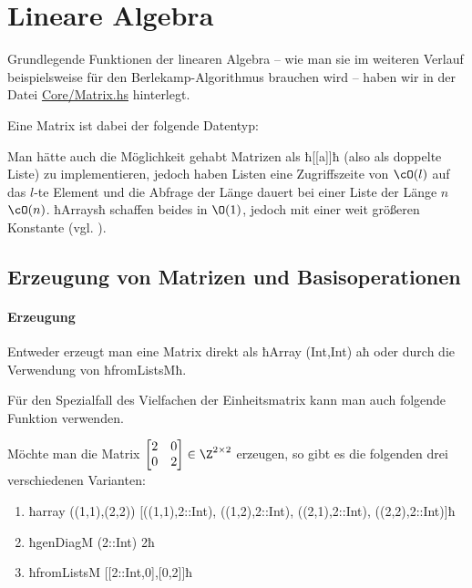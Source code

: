 \section{Lineare Algebra}
\label{sec:linalg}

Grundlegende Funktionen der linearen Algebra -- wie man sie im weiteren Verlauf
beispielsweise für den Berlekamp-Algorithmus brauchen wird -- haben wir in der
Datei \url{Core/Matrix.hs} hinterlegt.

Eine Matrix ist dabei der folgende Datentyp:


Man hätte auch die Möglichkeit gehabt Matrizen als ħ[[a]]ħ (also als doppelte
Liste) zu implementieren, jedoch haben Listen eine Zugriffszeite von $\cO(l)$ auf
das $l$-te Element und die Abfrage der Länge dauert bei einer Liste der Länge
$n$ $\cO(n)$. ħArraysħ schaffen beides in $\O(1)$, jedoch mit einer
weit größeren Konstante (vgl. \url{}). 

\subsection{Erzeugung von Matrizen und Basisoperationen}

\paragraph{Erzeugung} Entweder erzeugt man eine Matrix direkt als
ħArray (Int,Int) aħ oder durch die Verwendung von ħfromListsMħ.


Für den Spezialfall des Vielfachen der Einheitsmatrix kann man auch folgende
Funktion verwenden.


\begin{beispiel}
  Möchte man die Matrix $\begin{bmatrix} 2 & 0 \\ 0 & 2 \end{bmatrix} \in
  \Z^{2\times 2}$
  erzeugen, so gibt es die folgenden drei verschiedenen Varianten:
  \begin{enumerate}
    \item ħarray ((1,1),(2,2)) [((1,1),2::Int), ((1,2),2::Int), ((2,1),2::Int), ((2,2),2::Int)]ħ
    \item ħgenDiagM (2::Int) 2ħ
    \item ħfromListsM [[2::Int,0],[0,2]]ħ
  \end{enumerate}
\end{beispiel}

